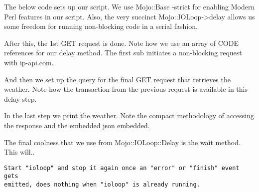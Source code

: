 \documentclass[14pt]{extreport}
\newcommand\Small{\fontsize{12}{13.0}\fontencoding{T1}\selectfont}
\newcommand*\LSTfont{\Small\ttfamily\SetTracking{encoding=*}{-60}\lsstyle}
\begin{document}
The below code sets up our script.  We use Mojo::Base -strict for enabling
Modern Perl features in our script.  Also, the very succinct
Mojo::IOLoop->delay allows us some freedom for running non-blocking code in a
serial fashion.



After this, the 1st GET request is done.  Note how we use an array of CODE
references for our delay method.  The first sub initiates a non-blocking
request with ip-api.com.



And then we set up the query for the final GET request that retrieves the
weather.  Note how the transaction from the previous request is available in
this delay step.



In the last step we print the weather.  Note the compact methodology of accessing
the response and the embedded json embedded.



The final coolness that we use from Mojo::IOLoop::Delay is the wait method.
This will..

\begin{lstlisting}[style=BlockStyle]
Start "ioloop" and stop it again once an "error" or "finish" event gets
emitted, does nothing when "ioloop" is already running.
\end{lstlisting}
\end{document}

